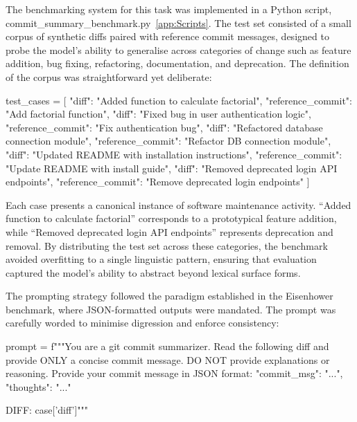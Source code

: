 \documentclass{report}
\begin{document}
The benchmarking system for this task was implemented in a Python script, commit_summary_benchmark.py~\ref{app:Scripts}. The test set consisted of a small corpus of synthetic diffs paired with reference commit messages, designed to probe the model’s ability to generalise across categories of change such as feature addition, bug fixing, refactoring, documentation, and deprecation. The definition of the corpus was straightforward yet deliberate:

\begin{python}
test_cases = [
    {"diff": "Added function to calculate factorial", "reference_commit": "Add factorial function"},
    {"diff": "Fixed bug in user authentication logic", "reference_commit": "Fix authentication bug"},
    {"diff": "Refactored database connection module", "reference_commit": "Refactor DB connection module"},
    {"diff": "Updated README with installation instructions", "reference_commit": "Update README with install guide"},
    {"diff": "Removed deprecated login API endpoints", "reference_commit": "Remove deprecated login endpoints"}
]

\end{python}

Each case presents a canonical instance of software maintenance activity. 
“Added function to calculate factorial” corresponds to a prototypical feature addition, while “Removed deprecated login API endpoints” represents deprecation and removal. 
By distributing the test set across these categories, the benchmark avoided overfitting to a single linguistic pattern, ensuring that evaluation captured the model’s ability to abstract beyond lexical surface forms.

The prompting strategy followed the paradigm established in the Eisenhower benchmark, where JSON-formatted outputs were mandated. 
The prompt was carefully worded to minimise digression and enforce consistency:

\begin{python}
    prompt = f"""You are a git commit summarizer.
Read the following diff and provide ONLY a concise commit message.
DO NOT provide explanations or reasoning.
Provide your commit message in JSON format: {{"commit_msg": "...", "thoughts": "..."}}

DIFF:
{case['diff']}"""

\end{python}
\end{document}
